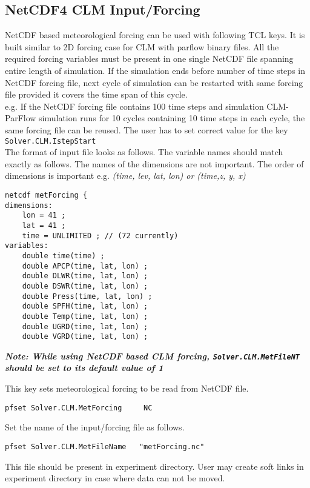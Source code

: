 \subsection{NetCDF4 CLM Input/Forcing}
NetCDF based meteorological forcing can be used with following TCL keys. It is built similar to 2D forcing case for CLM with parflow binary files. All the required forcing variables must be present in one single NetCDF file spanning entire length of simulation. If the simulation ends before number of time steps in NetCDF forcing file, next cycle of simulation can be restarted with same forcing file provided it covers the time span of this cycle.\\
e.g. If the NetCDF forcing file contains 100 time steps and simulation CLM-ParFlow simulation runs for 10 cycles containing 10 time steps in each cycle, the same forcing file can be reused. The user has to set correct value for the key \texttt{Solver.CLM.IstepStart}\\
The format of input file looks as follows. The variable names should match exactly as follows. The names of the dimensions are not important. The order of dimensions is important e.g. \textit{(time, lev, lat, lon) or (time,z, y, x)}
\begin{display}\begin{verbatim}
netcdf metForcing {
dimensions:
	lon = 41 ;
	lat = 41 ;
	time = UNLIMITED ; // (72 currently)
variables:
	double time(time) ;
	double APCP(time, lat, lon) ;
	double DLWR(time, lat, lon) ;
	double DSWR(time, lat, lon) ;
	double Press(time, lat, lon) ;
	double SPFH(time, lat, lon) ;
	double Temp(time, lat, lon) ;
	double UGRD(time, lat, lon) ;
	double VGRD(time, lat, lon) ;
\end{verbatim}\end{display}
\textbf{\textit{Note: While using NetCDF based CLM forcing, \texttt{Solver.CLM.MetFileNT} should be set to its default value of 1}}

{This key sets meteorological forcing to be read from NetCDF file.}
\begin{display}\begin{verbatim}
pfset Solver.CLM.MetForcing     NC
\end{verbatim}\end{display}
Set the name of the input/forcing file as follows.
\begin{display}\begin{verbatim}
pfset Solver.CLM.MetFileName   "metForcing.nc"
\end{verbatim}\end{display}
This file should be present in experiment directory. User may create soft links in experiment directory in case where data can not be moved.

